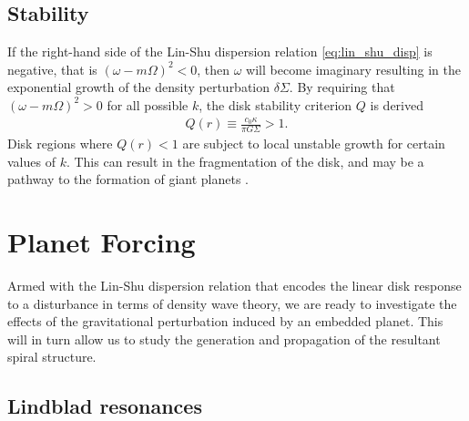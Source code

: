 \subsection{Stability}

If the right-hand side of the Lin-Shu dispersion relation \eqref{eq:lin_shu_disp} is negative, that is $(\omega - m \Omega)^2 < 0$, then $\omega$ will become imaginary resulting in the exponential growth of the density perturbation $\delta \Sigma$.
By requiring that $(\omega - m \Omega)^2 > 0$ for all possible $k$, the disk stability criterion $Q$ is derived \citep{toomre1964}
\begin{align}
    Q(r) \equiv \frac{c_0 \kappa}{\pi G \Sigma} > 1.
\end{align}
Disk regions where $Q(r) < 1$ are subject to local unstable growth for certain values of $k$.
This can result in the fragmentation of the disk, and may be a pathway to the formation of giant planets \citep{boss1997}.

\section{Planet Forcing} \label{sec:planet_forcing}

Armed with the Lin-Shu dispersion relation that encodes the linear disk response to a disturbance in terms of density wave theory, we are ready to investigate the effects of the gravitational perturbation induced by an embedded planet.
This will in turn allow us to study the generation and propagation of the resultant spiral structure.

\subsection{Lindblad resonances}


